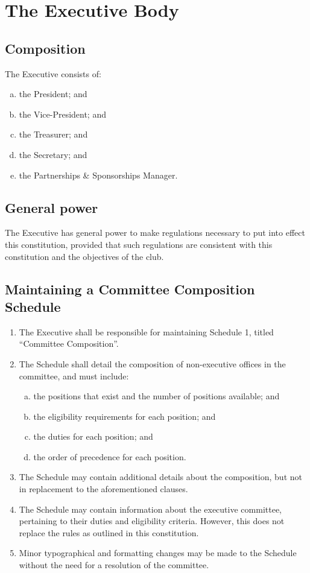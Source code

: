 \documentclass{constitution}
\begin{document}
\section{The Executive Body}\label{executiveBody}

\subsection{Composition}
The Executive consists of:
\begin{enumerate}[(a)]
    \item the President; and
    \item the Vice-President; and
    \item the Treasurer; and
    \item the Secretary; and
    \item the Partnerships \& Sponsorships Manager.
\end{enumerate}

\subsection{General power}
The Executive has general power to make regulations necessary to put into effect this constitution, provided that such regulations are consistent with this constitution and the objectives of the club.

\subsection{Maintaining a Committee Composition Schedule}\label{schedule1}
\begin{enumerate}[(1)]
    \item The Executive shall be responsible for maintaining Schedule 1, titled ``Committee Composition''.
    \item The Schedule shall detail the composition of non-executive offices in the committee, and must include:
          \begin{enumerate}[(a)]
              \item the positions that exist and the number of positions available; and
              \item the eligibility requirements for each position; and
              \item the duties for each position; and
              \item the order of precedence for each position.
          \end{enumerate}
    \item The Schedule may contain additional details about the composition, but not in replacement to the aforementioned clauses.
    \item The Schedule may contain information about the executive committee, pertaining to their duties and eligibility criteria. However, this does not replace the rules as outlined in this constitution.
    \item Minor typographical and formatting changes may be made to the Schedule without the need for a resolution of the committee.
\end{enumerate}
\end{document}
